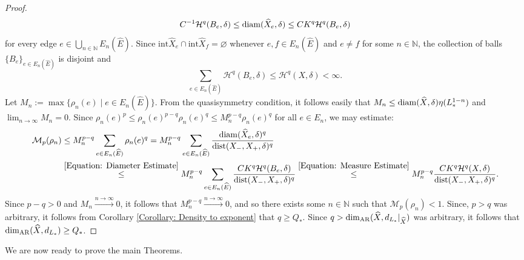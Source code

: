 \documentclass{amsart}
\newcommand{\diam}{{\rm diam}}
\newcommand{\dist}{{\rm dist}}
\newcommand{\AR}{{\rm AR}}
\numberwithin{equation}{section}
\theoremstyle{definition}
\theoremstyle{remark}
\newcommand{\N}{\mathbb{N}}
\newcommand{\cH}{\mathcal{H}}
\newcommand{\cM}{\mathcal{M}}
\begin{document}
\begin{proof}
\begin{equation}
                C^{-1}\cH^q(B_e,\delta)\leq\diam(\widehat{X}_e,\delta)\leq CK^q\cH^q(B_e,\delta)
            \end{equation}
        for every edge \(e\in \bigcup_{n\in\N}E_n(\widehat{E})\). Since \(\mathrm{int}\widehat{X}_e\cap\mathrm{int}\widehat{X}_f=\varnothing\) whenever \(e,f\in E_n(\widehat{E})\) and \(e\neq f\) for some \(n\in\N\), the collection of balls \(\{B_e\}_{e\in E_n(\widehat{E})}\) is disjoint and
            \begin{equation}\label{Equation: Measure Estimate}
                \sum_{e\in E_n(\widehat{E})}\cH^q(B_e,\delta)\leq \cH^q(X,\delta)<\infty.
            \end{equation}
        Let \(M_n:=\max\{\rho_n(e)\mid e\in E_n(\widehat{E})\}\). From the quasisymmetry condition, it follows easily that $M_n \leq \diam(\widehat{X},\delta)\eta(L_*^{1-n})$ and $\lim_{n\to\infty} M_n = 0$. Since \(\rho_n(e)^p\leq\rho_n(e)^{p-q}\rho_n(e)^q\leq M_n^{p-q}\rho_n(e)^q\) for all \(e\in E_n\), we may estimate:
            \begin{equation}\label{Equation: Density Estimate}
            \begin{split}
                \cM_p(\rho_n)&\leq M_n^{p-q}\sum_{e\in E_n(\widehat{E})}\rho_n(e)^q=M_n^{p-q}\sum_{e\in E_n(\widehat{E})}\frac{\diam(\widehat{X}_e,\delta)^q}{\dist(X_-,X_+,\delta)^q}\\
                &\stackrel{\eqref{Equation: Diameter Estimate}}{\leq} M_n^{p-q}\sum_{e\in E_n(\widehat{E})}\frac{CK^q\cH^q(B_e,\delta)}{\dist(X_-,X_+,\delta)^q}\stackrel{\eqref{Equation: Measure Estimate}}{\leq} M_n^{p-q}\frac{CK^q\cH^q(X,\delta)}{\dist(X_-,X_+,\delta)^q}.
            \end{split}    
            \end{equation}
        Since \(p-q>0\) and \(M_n\stackrel{n\to\infty}{\to}0\), it follows that \(M_n^{p-q}\stackrel{n\to\infty}{\to}0\), and so there exists some \(n\in\N\) such that \(\cM_p(\rho_n)<1\). Since, \(p>q\) was arbitrary, it follows from Corollary \ref{Corollary: Density to exponent} that \(q\geq Q_*\). Since \(q>\dim_\AR(\widehat{X},d_{L_*}\vert_{\widehat{X}})\) was arbitrary, it follows that \(\dim_\AR(\widehat{X},d_{L_*})\geq Q_*\).
    \end{proof}

        We are now ready to prove the main Theorems.
    
\end{document}
